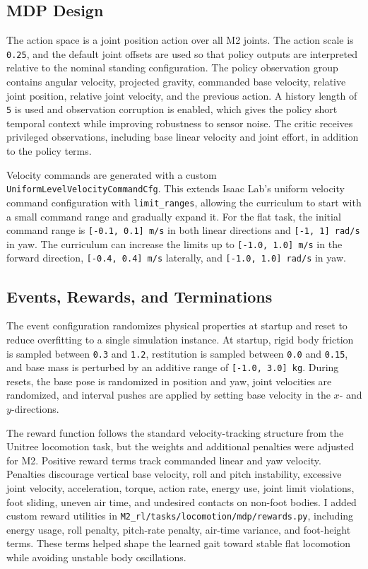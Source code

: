 \subsection{MDP Design}

The action space is a joint position action over all M2 joints. The action scale is \texttt{0.25}, and
the default joint offsets are used so that policy outputs are interpreted relative to the nominal standing
configuration. The policy observation group contains angular velocity, projected gravity, commanded base
velocity, relative joint position, relative joint velocity, and the previous action. A history length of
\texttt{5} is used and observation corruption is enabled, which gives the policy short temporal context
while improving robustness to sensor noise. The critic receives privileged observations, including base
linear velocity and joint effort, in addition to the policy terms.

Velocity commands are generated with a custom \texttt{UniformLevelVelocityCommandCfg}. This extends Isaac
Lab's uniform velocity command configuration with \texttt{limit\_ranges}, allowing the curriculum to start
with a small command range and gradually expand it. For the flat task, the initial command range is
\texttt{[-0.1, 0.1] m/s} in both linear directions and \texttt{[-1, 1] rad/s} in yaw. The curriculum can
increase the limits up to \texttt{[-1.0, 1.0] m/s} in the forward direction,
\texttt{[-0.4, 0.4] m/s} laterally, and \texttt{[-1.0, 1.0] rad/s} in yaw.

\subsection{Events, Rewards, and Terminations}

The event configuration randomizes physical properties at startup and reset to reduce overfitting to a
single simulation instance. At startup, rigid body friction is sampled between \texttt{0.3} and
\texttt{1.2}, restitution is sampled between \texttt{0.0} and \texttt{0.15}, and base mass is perturbed by
an additive range of \texttt{[-1.0, 3.0] kg}. During resets, the base pose is randomized in position and
yaw, joint velocities are randomized, and interval pushes are applied by setting base velocity in the
\(x\)- and \(y\)-directions.

The reward function follows the standard velocity-tracking structure from the Unitree locomotion task, but
the weights and additional penalties were adjusted for M2. Positive reward terms track commanded
linear and yaw velocity. Penalties discourage vertical base velocity, roll and pitch instability, excessive
joint velocity, acceleration, torque, action rate, energy use, joint limit violations, foot sliding,
uneven air time, and undesired contacts on non-foot bodies. I added custom reward utilities in
\texttt{M2\_rl/tasks/locomotion/mdp/rewards.py}, including energy usage, roll penalty, pitch-rate
penalty, air-time variance, and foot-height terms. These terms helped shape the learned gait toward stable
flat locomotion while avoiding unstable body oscillations.


